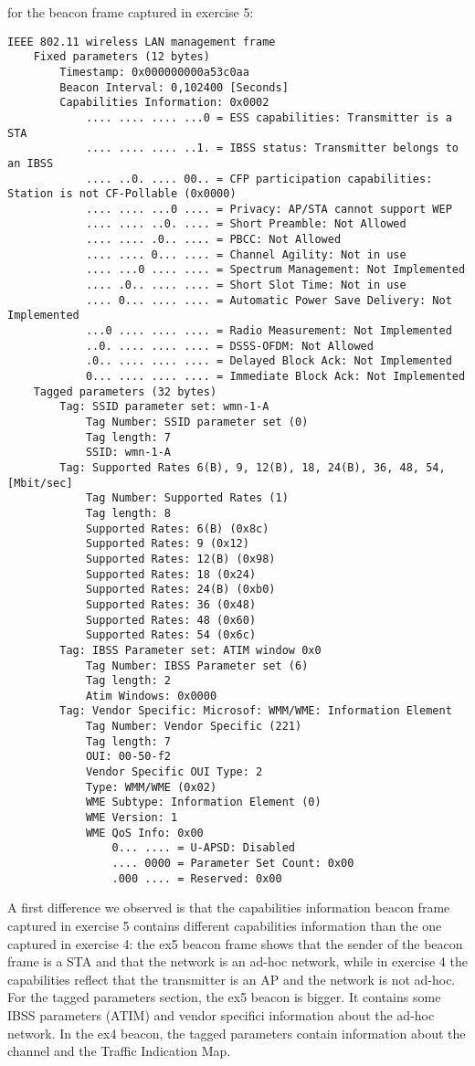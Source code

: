 %
for the beacon frame captured in exercise 5:
\begin{lstlisting}
IEEE 802.11 wireless LAN management frame
    Fixed parameters (12 bytes)
        Timestamp: 0x000000000a53c0aa
        Beacon Interval: 0,102400 [Seconds]
        Capabilities Information: 0x0002
            .... .... .... ...0 = ESS capabilities: Transmitter is a STA
            .... .... .... ..1. = IBSS status: Transmitter belongs to an IBSS
            .... ..0. .... 00.. = CFP participation capabilities: Station is not CF-Pollable (0x0000)
            .... .... ...0 .... = Privacy: AP/STA cannot support WEP
            .... .... ..0. .... = Short Preamble: Not Allowed
            .... .... .0.. .... = PBCC: Not Allowed
            .... .... 0... .... = Channel Agility: Not in use
            .... ...0 .... .... = Spectrum Management: Not Implemented
            .... .0.. .... .... = Short Slot Time: Not in use
            .... 0... .... .... = Automatic Power Save Delivery: Not Implemented
            ...0 .... .... .... = Radio Measurement: Not Implemented
            ..0. .... .... .... = DSSS-OFDM: Not Allowed
            .0.. .... .... .... = Delayed Block Ack: Not Implemented
            0... .... .... .... = Immediate Block Ack: Not Implemented
    Tagged parameters (32 bytes)
        Tag: SSID parameter set: wmn-1-A
            Tag Number: SSID parameter set (0)
            Tag length: 7
            SSID: wmn-1-A
        Tag: Supported Rates 6(B), 9, 12(B), 18, 24(B), 36, 48, 54, [Mbit/sec]
            Tag Number: Supported Rates (1)
            Tag length: 8
            Supported Rates: 6(B) (0x8c)
            Supported Rates: 9 (0x12)
            Supported Rates: 12(B) (0x98)
            Supported Rates: 18 (0x24)
            Supported Rates: 24(B) (0xb0)
            Supported Rates: 36 (0x48)
            Supported Rates: 48 (0x60)
            Supported Rates: 54 (0x6c)
        Tag: IBSS Parameter set: ATIM window 0x0
            Tag Number: IBSS Parameter set (6)
            Tag length: 2
            Atim Windows: 0x0000
        Tag: Vendor Specific: Microsof: WMM/WME: Information Element
            Tag Number: Vendor Specific (221)
            Tag length: 7
            OUI: 00-50-f2
            Vendor Specific OUI Type: 2
            Type: WMM/WME (0x02)
            WME Subtype: Information Element (0)
            WME Version: 1
            WME QoS Info: 0x00
                0... .... = U-APSD: Disabled
                .... 0000 = Parameter Set Count: 0x00
                .000 .... = Reserved: 0x00
\end{lstlisting}
%
A first difference we observed is that the capabilities information beacon frame captured
in exercise 5 contains different capabilities information than the one captured in exercise 4:
the ex5 beacon frame shows that the sender of the beacon frame is a STA and that the network is
an ad-hoc network, while in exercise 4 the capabilities reflect that the transmitter is an AP
and the network is not ad-hoc.\\
For the tagged parameters section, the ex5 beacon is bigger. It contains some IBSS parameters (ATIM) and vendor specifici information about the ad-hoc network.
 In the ex4 beacon, the tagged parameters contain information about the channel and the Traffic Indication Map.
